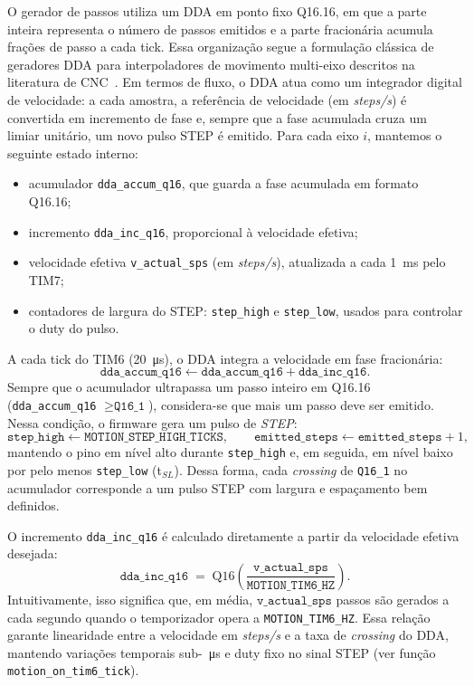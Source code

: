O gerador de passos utiliza um DDA em ponto fixo Q16.16, em que a parte
inteira representa o n\'umero de passos emitidos e a parte fracion\'aria
acumula fra\c{c}\~oes de passo a cada tick. Essa organiza\c{c}\~ao segue a
formula\c{c}\~ao cl\'assica de geradores DDA para interpoladores de movimento
multi-eixo descritos na literatura de CNC~\cite{fussell2003,idc_cnc_interp,koren_reference,efficient_reference}.
Em termos de fluxo, o DDA atua como um integrador digital de velocidade:
a cada amostra, a refer\^encia de velocidade (em \emph{steps/s}) \'e
convertida em incremento de fase e, sempre que a fase acumulada cruza um
limiar unit\'ario, um novo pulso STEP \'e emitido.
Para cada eixo $i$, mantemos o
seguinte estado interno:
\begin{itemize}
  \item acumulador \texttt{dda\_accum\_q16}, que guarda a fase acumulada em
        formato Q16.16;
  \item incremento \texttt{dda\_inc\_q16}, proporcional \`a velocidade efetiva;
  \item velocidade efetiva \texttt{v\_actual\_sps} (em \emph{steps/s}),
        atualizada a cada \SI{1}{ms} pelo TIM7;
  \item contadores de largura do STEP: \texttt{step\_high} e
        \texttt{step\_low}, usados para controlar o duty do pulso.
\end{itemize}
A cada tick do TIM6 (\SI{20}{\micro s}), o DDA integra a velocidade em fase
fracion\'aria:
\[
  \texttt{dda\_accum\_q16} \leftarrow
  \texttt{dda\_accum\_q16} + \texttt{dda\_inc\_q16}.
\]
Sempre que o acumulador ultrapassa um passo inteiro em Q16.16
(\texttt{dda\_accum\_q16} $\ge \texttt{Q16\_1}$), considera-se que mais um
passo deve ser emitido. Nessa condi\c{c}\~ao, o firmware gera um pulso de
\emph{STEP}:
\[
  \texttt{step\_high} \leftarrow \texttt{MOTION\_STEP\_HIGH\_TICKS},\qquad
  \texttt{emitted\_steps} \leftarrow \texttt{emitted\_steps}+1,
\]
mantendo o pino em n\'ivel alto durante \texttt{step\_high} e, em seguida,
em n\'ivel baixo por pelo menos \texttt{step\_low} (t$_{SL}$). Dessa forma,
cada \emph{crossing} de \texttt{Q16\_1} no acumulador corresponde a um pulso
STEP com largura e espa\c{c}amento bem definidos.

O incremento \texttt{dda\_inc\_q16} \'e calculado diretamente a partir da
velocidade efetiva desejada:
\[
  \texttt{dda\_inc\_q16} \;=\;
  \mathrm{Q16}\!\left(\frac{\texttt{v\_actual\_sps}}{\texttt{MOTION\_TIM6\_HZ}}\right).
\]
Intuitivamente, isso significa que, em m\'edia, $\texttt{v\_actual\_sps}$
passos s\~ao gerados a cada segundo quando o temporizador opera a
\texttt{MOTION\_TIM6\_HZ}. Essa rela\c{c}\~ao garante linearidade entre a
velocidade em \emph{steps/s} e a taxa de \emph{crossing} do DDA, mantendo
varia\c{c}\~oes temporais sub-\SI{}{\micro s} e duty fixo no sinal STEP (ver
fun\c{c}\~ao \texttt{motion\_on\_tim6\_tick}).


